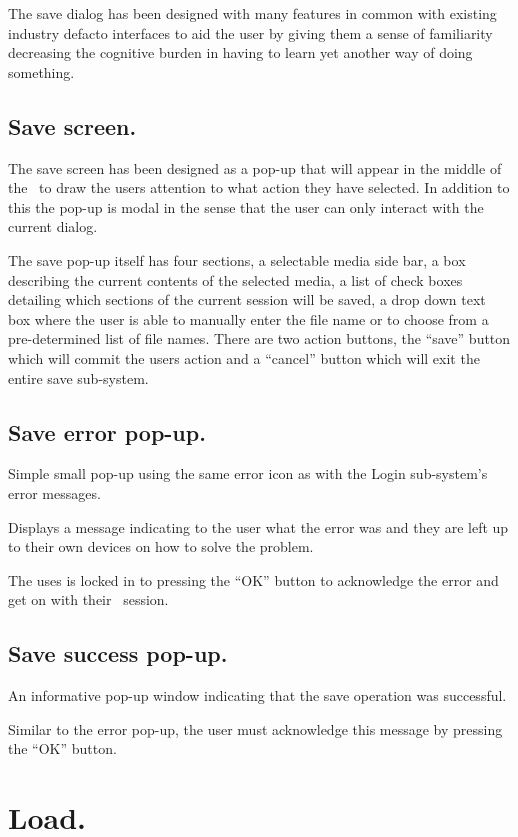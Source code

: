 The save dialog has been designed with many features in common with existing industry defacto interfaces to aid the user by giving them a sense of familiarity decreasing the cognitive burden in having to learn yet another way of doing something.

\subsection{Save screen.}

The save screen has been designed as a pop-up that will appear in the middle of the \iDesk\ to draw the users attention to what action they have selected. In addition to this the pop-up is modal in the sense that the user can only interact with the current dialog.

The save pop-up itself has four sections, a selectable media side bar, a box describing the current contents of the selected media, a list of check boxes detailing which sections of the current session will be saved, a drop down text box where the user is able to manually enter the file name or to choose from a pre-determined list of file names. There are two action buttons, the ``save'' button which will commit the users action and a ``cancel'' button which will exit the entire save sub-system.

\subsection{Save error pop-up.}

Simple small pop-up using the same error icon as with the Login sub-system's error messages.

Displays a message indicating to the user what the error was and they are left up to their own devices on how to solve the problem.

The uses is locked in to pressing the ``OK'' button to acknowledge the error and get on with their \iDesk\ session.

\subsection{Save success pop-up.}

An informative pop-up window indicating that the save operation was successful.

Similar to the error pop-up, the user must acknowledge this message by pressing the ``OK'' button.

\section{Load.}

